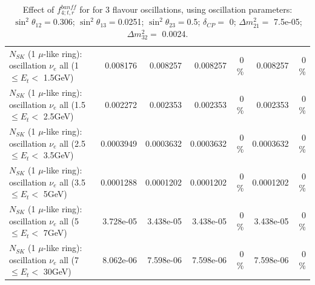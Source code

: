 \begin{table}
\begin{tabular}{| l | r | r | r  r | r  r |}
$N_{SK}$ (1 $\mu$-like ring): oscillation $\nu_{e}$ all (1 $\leq E_{t} <$ 1.5GeV) &        0.008176 &        0.008257 &        0.008257 &        0 \%  &        0.008257 &        0 \%  \\ 
$N_{SK}$ (1 $\mu$-like ring): oscillation $\nu_{e}$ all (1.5 $\leq E_{t} <$ 2.5GeV) &        0.002272 &        0.002353 &        0.002353 &        0 \%  &        0.002353 &        0 \%  \\ 
$N_{SK}$ (1 $\mu$-like ring): oscillation $\nu_{e}$ all (2.5 $\leq E_{t} <$ 3.5GeV) &       0.0003949 &       0.0003632 &       0.0003632 &        0 \%  &       0.0003632 &        0 \%  \\ 
$N_{SK}$ (1 $\mu$-like ring): oscillation $\nu_{e}$ all (3.5 $\leq E_{t} <$ 5GeV) &       0.0001288 &       0.0001202 &       0.0001202 &        0 \%  &       0.0001202 &        0 \%  \\ 
 $N_{SK}$ (1 $\mu$-like ring): oscillation $\nu_{e}$ all (5 $\leq E_{t} <$ 7GeV) &       3.728e-05 &       3.438e-05 &       3.438e-05 &        0 \%  &       3.438e-05 &        0 \%  \\ 
$N_{SK}$ (1 $\mu$-like ring): oscillation $\nu_{e}$ all (7 $\leq E_{t} <$ 30GeV) &       8.062e-06 &       7.598e-06 &       7.598e-06 &        0 \%  &       7.598e-06 &        0 \%  \\ 
\hline
\hline
\end{tabular}
\caption{ Effect of $f_{4; t, r}^{banff}$ for for 3 flavour oscillations, using oscillation parameters:  $\sin^2\theta_{12} = $0.306; $\sin^2\theta_{13} = $0.0251; $\sin^2\theta_{23} = $0.5; $\delta_{CP} = $        0; $\Delta m^2_{21} = $    7.5e-05; $\Delta m^2_{32} = $    0.0024. }
\label{tab:num_banff_04_1RmuT_3f_osc_t13:0.0251}
\end{table}
\clearpage

